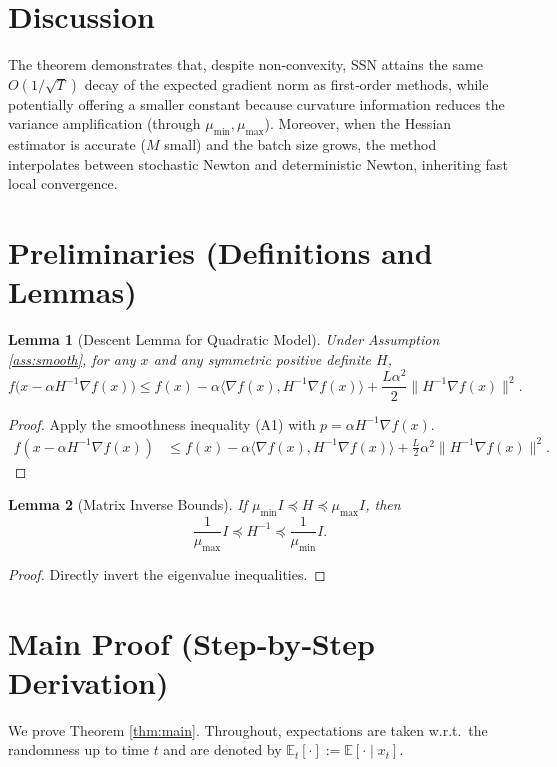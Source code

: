\documentclass{article}
\newtheorem{lemma}{Lemma}
\newcommand{\E}{\mathbb{E}}
\begin{document}
\section*{Discussion}
The theorem demonstrates that, despite non‑convexity, SSN attains the same $O(1/\sqrt{T})$ decay of the expected gradient norm as first‑order methods, while potentially offering a smaller constant because curvature information reduces the variance amplification (through $\mu_{\min},\mu_{\max}$). Moreover, when the Hessian estimator is accurate ($M$ small) and the batch size grows, the method interpolates between stochastic Newton and deterministic Newton, inheriting fast local convergence.

\newpage
\section*{Preliminaries (Definitions and Lemmas)}
\begin{lemma}[Descent Lemma for Quadratic Model]\label{lem:desc}
Under Assumption \ref{ass:smooth}, for any $x$ and any symmetric positive definite $H$,
\[
f\big(x-\alpha H^{-1}\nabla f(x)\big)
\le
f(x)-\alpha\langle\nabla f(x),H^{-1}\nabla f(x)\rangle
+\frac{L\alpha^{2}}{2}\|H^{-1}\nabla f(x)\|^{2}.
\tag{L1}
\]
\end{lemma}
\begin{proof}
Apply the smoothness inequality (A1) with $p=\alpha H^{-1}\nabla f(x)$.
\[
\begin{aligned}
f(x-\alpha H^{-1}\nabla f(x))
&\le f(x)-\alpha\langle\nabla f(x),H^{-1}\nabla f(x)\rangle
+\frac{L}{2}\alpha^{2}\|H^{-1}\nabla f(x)\|^{2}.
\end{aligned}
\]
\end{proof}

\begin{lemma}[Matrix Inverse Bounds]\label{lem:inv}
If $\mu_{\min} I\preceq H\preceq\mu_{\max} I$, then
\[
\frac{1}{\mu_{\max}} I\preceq H^{-1}\preceq\frac{1}{\mu_{\min}} I.
\tag{L2}
\]
\end{lemma}
\begin{proof}
Directly invert the eigenvalue inequalities.
\end{proof}

\section*{Main Proof (Step‑by‑Step Derivation)}
We prove Theorem \ref{thm:main}. Throughout, expectations are taken w.r.t.\ the randomness up to time $t$ and are denoted by $\E_t[\cdot]:=\E[\cdot\mid x_t]$.
\end{document}
